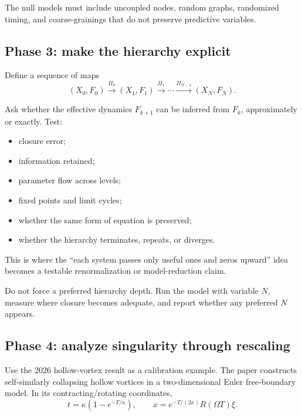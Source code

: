 \documentclass[11pt]{article}
\newcommand{\Coarse}{\Pi}
\theoremstyle{definition}
\theoremstyle{plain}
\theoremstyle{remark}
\begin{document}
The null models must include uncoupled nodes, random graphs, randomized timing, and coarse-grainings that do not preserve predictive variables.

\subsection{Phase 3: make the hierarchy explicit}

Define a sequence of maps
\begin{equation}
  (X_0,F_0)\xrightarrow{\Coarse_0}(X_1,F_1)
  \xrightarrow{\Coarse_1}\cdots
  \xrightarrow{\Coarse_{N-1}}(X_N,F_N).
  \label{eq:hierarchy}
\end{equation}

Ask whether the effective dynamics $F_{k+1}$ can be inferred from $F_k$, approximately or exactly. Test:
\begin{itemize}
  \item closure error;
  \item information retained;
  \item parameter flow across levels;
  \item fixed points and limit cycles;
  \item whether the same form of equation is preserved;
  \item whether the hierarchy terminates, repeats, or diverges.
\end{itemize}

This is where the ``each system passes only useful ones and zeros upward'' idea becomes a testable renormalization or model-reduction claim.

Do not force a preferred hierarchy depth. Run the model with variable $N$, measure where closure becomes adequate, and report whether any preferred $N$ appears.

\subsection{Phase 4: analyze singularity through rescaling}

Use the 2026 hollow-vortex result as a calibration example. The paper constructs self-similarly collapsing hollow vortices in a two-dimensional Euler free-boundary model. In its contracting/rotating coordinates,
\begin{equation}
  t=\kappa(1-e^{-T/\kappa}),
  \qquad
  x=e^{-T/(2\kappa)}R(\Omega T)\xi.
  \label{eq:hollow-vortex-coordinates}
\end{equation}
\end{document}
